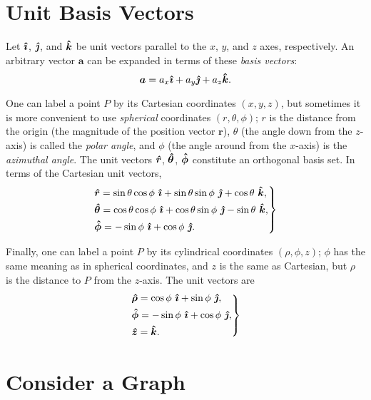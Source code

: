 \documentclass{article}
\begin{document}
\section{Unit Basis Vectors}

Let $\bm{\hat{\imath}}$, $\bm{\hat{\jmath}}$, and $\bm{\hat{k}}$ be unit vectors parallel to the $x$, $y$, and $z$ axes, respectively. An arbitrary vector $\bm{a}$ can be expanded in terms of these \emph{basis vectors}:
\begin{equation}
    \bm{a} = a_x \bm{\hat{\imath}} + a_y \bm{\hat{\jmath}} + a_z \bm{\hat{k}}.
\end{equation}

One can label a point $P$ by its Cartesian coordinates $(x, y, z)$, but sometimes it is more convenient to use \emph{spherical} coordinates $(r, \theta, \phi)$; $r$ is the distance from the origin (the magnitude of the position vector $\bm{r}$), $\theta$ (the angle down from the $z$-axis) is called the \emph{polar angle}, and $\phi$ (the angle around from the $x$-axis) is the \emph{azimuthal angle}. The unit vectors $\bm{\hat{r}}$, $\bm{\hat{\theta}}$, $\bm{\hat{\phi}}$ constitute an orthogonal basis set. In terms of the Cartesian unit vectors,
\begin{equation}
    \begin{rcases} \displaystyle \bm{\hat{r}} = \sin{\theta}\cos{\phi}\ \bm{\hat{\imath}} + \sin{\theta}\sin{\phi}\ \bm{\hat{\jmath}} + \cos{\theta}\ \bm{\hat{k}}, \\ \displaystyle \bm{\hat{\theta}} = \cos{\theta}\cos{\phi}\ \bm{\hat{\imath}} + \cos{\theta}\sin{\phi}\ \bm{\hat{\jmath}} - \sin{\theta}\ \bm{\hat{k}}, \\ \displaystyle \bm{\hat{\phi}} = -\sin{\phi}\ \bm{\hat{\imath}} + \cos{\phi}\ \bm{\hat{\jmath}}. \end{rcases}
\end{equation}

Finally, one can label a point $P$ by its cylindrical coordinates $(\rho, \phi, z)$; $\phi$ has the same meaning as in spherical coordinates, and $z$ is the same as Cartesian, but $\rho$ is the distance to $P$ from the $z$-axis. The unit vectors are
\begin{equation}
    \begin{rcases} \displaystyle \bm{\hat{\rho}} = \cos{\phi}\ \bm{\hat{\imath}} + \sin{\phi}\ \bm{\hat{\jmath}}, \\ \displaystyle \bm{\hat{\phi}} = -\sin{\phi}\ \bm{\hat{\imath}} + \cos{\phi}\ \bm{\hat{\jmath}}, \\ \displaystyle \bm{\hat{z}} = \bm{\hat{k}}. \end{rcases}
\end{equation}

\section{Consider a Graph}
\end{document}
